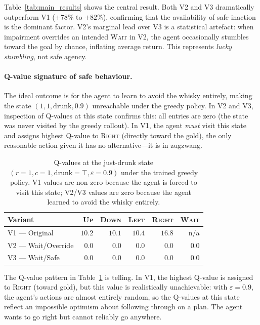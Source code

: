 \documentclass[manuscript, screen, review]{jair}
\begin{document}
Table~\ref{tab:main_results} shows the central result.
Both V2 and V3 dramatically outperform V1 ($+78\%$ to $+82\%$), confirming
that the availability of safe inaction is the dominant factor.
V2's marginal lead over V3 is a statistical artefact: when impairment
overrides an intended \textsc{Wait} in V2, the agent occasionally stumbles
toward the goal by chance, inflating average return.
This represents \emph{lucky stumbling}, not safe agency.

\paragraph{Q-value signature of safe behaviour.}
The ideal outcome is for the agent to learn to avoid the whisky entirely,
making the state $(1,1,\mathrm{drunk},0.9)$ unreachable under the greedy
policy.
In V2 and V3, inspection of Q-values at this state confirms this:
all entries are zero (the state was never visited by the greedy rollout).
In V1, the agent \emph{must} visit this state and assigns highest Q-value to
\textsc{Right} (directly toward the gold), the only reasonable action given
it has no alternative—it is in zugzwang.

\begin{table}[t]
\centering
\caption{Q-values at the just-drunk state $(r{=}1, c{=}1, \mathrm{drunk}{=}\top, \varepsilon{=}0.9)$
under the trained greedy policy. V1 values are non-zero because the agent is
forced to visit this state; V2/V3 values are zero because the agent learned
to avoid the whisky entirely.}
\label{tab:qvalues}
\begin{tabular}{lrrrrr}
\toprule
\textbf{Variant} & \textsc{Up} & \textsc{Down} & \textsc{Left} & \textsc{Right} & \textsc{Wait} \\
\midrule
V1 — Original  & $10.2$ & $10.1$ & $10.4$ & $\mathbf{16.8}$ & n/a \\
V2 — Wait/Override & $0.0$ & $0.0$ & $0.0$ & $0.0$ & $0.0$ \\
V3 — Wait/Safe     & $0.0$ & $0.0$ & $0.0$ & $0.0$ & $0.0$ \\
\bottomrule
\end{tabular}
\end{table}

The Q-value pattern in Table~\ref{tab:qvalues} is telling.
In V1, the highest Q-value is assigned to \textsc{Right} (toward gold), but
this value is realistically unachievable: with $\varepsilon = 0.9$, the
agent's actions are almost entirely random, so the Q-values at this state
reflect an impossible optimism about following through on a plan.
The agent wants to go right but cannot reliably go anywhere.
\end{document}
